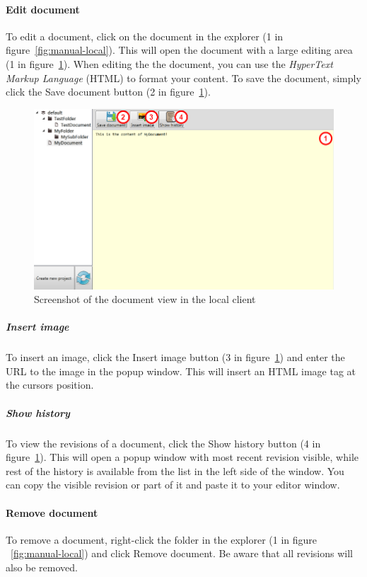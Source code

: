 	\paragraph{Edit document}
	To edit a document, click on the document in the explorer (1 in figure~\ref{fig:manual-local}). This will open the document with a large editing area (1 in figure~\ref{fig:manual-local-document}). When editing the the document, you can use the \emph{HyperText Markup Language}\cite{w3cHTML} (HTML) to format your content. To save the document, simply click the Save document button (2 in figure~\ref{fig:manual-local-document}).
	
	\begin{figure}[htb]
		\centering
		\includegraphics[width=1\textwidth]{User_manual/graphics/local-document.png}
		\caption{Screenshot of the document view in the local client}
		\label{fig:manual-local-document}
	\end{figure}
	
		\subparagraph{Insert image}
		To insert an image, click the Insert image button (3 in figure~\ref{fig:manual-local-document}) and enter the URL to the image in the popup window. This will insert an HTML image tag at the cursors position.
		
		\subparagraph{Show history}
		To view the revisions of a document, click the Show history button (4 in figure~\ref{fig:manual-local-document}). This will open a popup window with most recent revision visible, while rest of the history is available from the list in the left side of the window. You can copy the visible revision or part of it and paste it to your editor window.
	
	\paragraph{Remove document}
	To remove a document, right-click the folder in the explorer (1 in figure ~\ref{fig:manual-local}) and click Remove document. Be aware that all revisions will also be removed.
